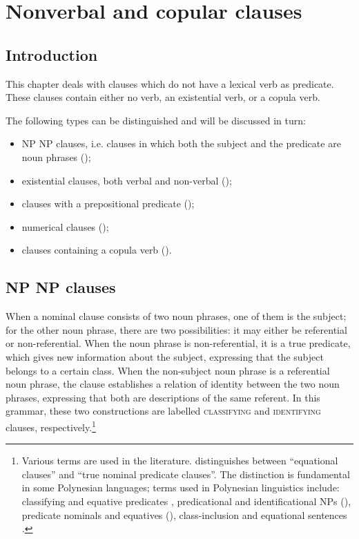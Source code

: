 \chapter[Nonverbal and copular clauses]{Nonverbal and copular clauses}\label{ch:9}
\section{Introduction}\label{sec:9.1}

This chapter deals with clauses which do not have a lexical verb as predicate. These clauses contain either no verb, an existential verb, or a copula verb. 

The following types can be distinguished and will be discussed in turn: 

\begin{itemize}
\item 
NP NP clauses, i.e. clauses in which both the subject and the predicate are noun phrases ();

\item 
existential clauses, both verbal and non-verbal ();

\item 
clauses with a prepositional predicate ();

\item 
numerical clauses ();

\item 
clauses containing a copula verb ().

\end{itemize}
\section{NP NP clauses}\label{sec:9.2}

When a nominal clause consists of two noun phrases, one of them is the subject; for the other noun phrase, there are two possibilities: it may either be referential or non-referential. When the noun phrase is non-referential, it is a true predicate, which gives new information about the subject, expressing that the subject belongs to a certain class. When the non-subject noun phrase is a referential noun phrase, the clause establishes a relation of identity between the two noun phrases, expressing that both are descriptions of the same referent. In this grammar, these two constructions are labelled \textsc{classifying} and \textsc{identifying} clauses, respectively.\footnote{\label{fn:459}Various terms are used in the literature. \citet[233]{Dryer2007Clause} distinguishes between “equational clauses” and “true nominal predicate clauses”. The distinction is fundamental in some Polynesian languages; terms used in Polynesian linguistics include: classifying and equative predicates \citep[78]{Bauer1993}, predicational and identificational NPs (\citealt[430]{ChungMason1995}), predicate nominals and equatives (\citealt{DeLacy1999}), class-inclusion and equational sentences \citep[45]{Cook1999}.}

